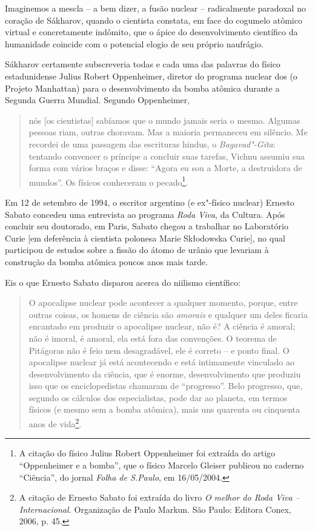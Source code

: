 Imaginemos a mescla -- a bem dizer, a fusão nuclear -- radicalmente
paradoxal no coração de Sákharov, quando o cientista constata, em face
do cogumelo atômico virtual e concretamente indômito, que o ápice do
desenvolvimento científico da humanidade coincide com o potencial elogio
de seu próprio naufrágio.

Sákharov certamente subscreveria todas e cada uma das palavras do físico
estadunidense Julius Robert Oppenheimer, diretor do programa nuclear dos
 (o Projeto Manhattan) para o desenvolvimento da bomba atômica
durante a Segunda Guerra Mundial. Segundo Oppenheimer,

\begin{quote}
nós {[}os cientistas{]} sabíamos que o mundo jamais seria o mesmo.
Algumas pessoas riam, outras choravam. Mas a maioria permaneceu em
silêncio. Me recordei de uma passagem das escrituras hindus, o
\emph{Bagavad"-Gita}: tentando convencer o príncipe a concluir suas
tarefas, Vichnu assumiu sua forma com vários braços e disse: ``Agora eu
sou a Morte, a destruidora de mundos''. Os físicos conheceram o
pecado\footnote{A citação do físico Julius Robert Oppenheimer foi
  extraída do artigo ``Oppenheimer e a bomba'', que o físico Marcelo
  Gleiser publicou no caderno ``Ciência'', do jornal \emph{Folha de
  S.Paulo}, em 16/05/2004.}.
\end{quote}

Em 12 de setembro de 1994, o escritor argentino (e ex"-físico nuclear)
Ernesto Sabato concedeu uma entrevista ao programa \emph{Roda Viva}, da
 Cultura. Após concluir seu doutorado, em Paris, Sabato chegou a
trabalhar no Laboratório Curie {[}em deferência à cientista polonesa
Marie Skłodowska Curie{]}, no qual participou de estudos sobre a fissão
do átomo de urânio que levariam à construção da bomba atômica poucos
anos mais tarde.

Eis o que Ernesto Sabato disparou acerca do niilismo científico:

\begin{quote}
O apocalipse nuclear pode acontecer a qualquer momento, porque, entre
outras coisas, os homens de ciência são \emph{amorais} e qualquer um
deles ficaria encantado em produzir o apocalipse nuclear, não é? A
ciência é amoral; não é imoral, é amoral, ela está fora das convenções.
O teorema de Pitágoras não é feio nem desagradável, ele é correto -- e
ponto final. O apocalipse nuclear já está acontecendo e está intimamente
vinculado ao desenvolvimento da ciência, que é enorme, desenvolvimento
que produziu isso que os enciclopedistas chamaram de ``progresso''. Belo
progresso, que, segundo os cálculos dos especialistas, pode dar ao
planeta, em termos físicos (e mesmo sem a bomba atômica), mais uns
quarenta ou cinquenta anos de vida\footnote{A citação de Ernesto Sabato
  foi extraída do livro \emph{O melhor do Roda Viva -- Internacional.}
  Organização de Paulo Markun. São Paulo: Editora Conex, 2006, p. 45.}.
\end{quote}

